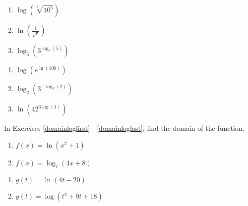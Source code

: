 \documentclass{ximera}
\begin{document}
\begin{multicols}{3}
\begin{enumerate}
\setcounter{enumi}{\value{HW}}

\item  $\log\left( \sqrt[3]{10^5} \right)$
\item  $\ln \left( \frac{1}{\sqrt{e}}\right)$
\item $\log_{5} \left(3^{\log_{3} (5)}\right)$

\setcounter{HW}{\value{enumi}}
\end{enumerate}
\end{multicols}


\begin{multicols}{3}
\begin{enumerate}
\setcounter{enumi}{\value{HW}}

\item $\log\left(e^{\ln(100)}\right)$ 
\item $\log_{2}\left(3^{-\log_{3}(2)}\right)$
\item $\ln\left(42^{6\log(1)}\right)$ \label{simplifyloglast}

\setcounter{HW}{\value{enumi}}
\end{enumerate}
\end{multicols}

In Exercises \ref{domainlogfirst} - \ref{domainloglast}, find the domain of the function.

\begin{multicols}{2}
\begin{enumerate}
\setcounter{enumi}{\value{HW}}


\item $f(x) = \ln(x^{2} + 1)$ \label{domainlogfirst}
\item $f(x) = \log_{7}(4x + 8)$

\setcounter{HW}{\value{enumi}}
\end{enumerate}
\end{multicols}

\begin{multicols}{2}
\begin{enumerate}
\setcounter{enumi}{\value{HW}}


\item $g(t) = \ln(4t-20)$
\item $g(t) = \log \left(t^2+9t+18\right)$

\setcounter{HW}{\value{enumi}}
\end{enumerate}
\end{multicols}
\end{document}
